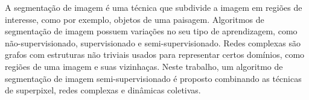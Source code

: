 A segmentação de imagem é uma técnica que subdivide a imagem em
regiões de interesse, como por exemplo, objetos de uma
paisagem. Algoritmos de segmentação de imagem possuem variações no seu
tipo de aprendizagem, como não-supervisionado, supervisionado e
semi-supervisionado. Redes complexas são grafos com estruturas não
triviais usados para representar certos domínios, como regiões de uma
imagem e suas vizinhaças. Neste trabalho, um algoritmo de segmentação
de imagem semi-supervisionado é proposto combinando as técnicas de
superpixel, redes complexas e dinâmicas coletivas.

